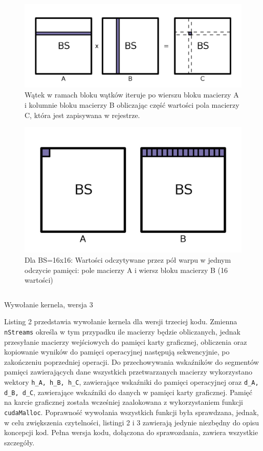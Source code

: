 \documentclass[12pt,a4paper]{article}
\begin{document}
\begin{figure}
  \includegraphics[width=\linewidth]{images/2.jpg}
  \caption{Wątek w ramach bloku wątków iteruje po wierszu bloku macierzy A i kolumnie bloku macierzy B obliczając część wartości pola macierzy C, która jest zapisywana w rejestrze.}
  \label{fig:matrix2}
\end{figure}

\begin{figure}
  \includegraphics[width=\linewidth]{images/3.jpg}
  \caption{Dla BS=16x16: Wartości odczytywane przez pół warpu w jednym odczycie pamięci: pole macierzy A i wiersz bloku macierzy B (16 wartości)}
  \label{fig:matrix2}
\end{figure}

\begin{listing}[H]
\inputminted{cuda}{listings/invocation_sync.cu}
\caption{Wywołanie kernela, wersja 3}
\label{lst:sync}
\end{listing}

Listing 2 przedstawia wywołanie kernela dla wersji trzeciej kodu. Zmienna \verb|nStreams| określa w tym przypadku ile macierzy będzie obliczanych, jednak przesyłanie macierzy wejściowych do pamięci karty graficznej, obliczenia oraz kopiowanie wyników do pamięci operacyjnej następują sekwencyjnie, po zakończeniu poprzedniej operacji. Do przechowywania wskaźników do segmentów pamięci zawierających dane wszystkich przetwarzanych macierzy wykorzystano wektory \verb|h_A, h_B, h_C|, zawierające wskaźniki do pamięci operacyjnej oraz \verb|d_A, d_B, d_C|, zawierające wskaźniki do danych w pamięci karty graficznej. Pamięć na karcie graficznej została wcześniej zaalokowana z wykorzystaniem funkcji \verb|cudaMalloc|. Poprawność wywołania wszystkich funkcji była sprawdzana, jednak, w celu zwiększenia czytelności, listingi 2 i 3 zawierają jedynie niezbędny do opisu koncepcji kod. Pełna wersja kodu, dołączona do sprawozdania, zawiera wszystkie szczegóły.
\end{document}
